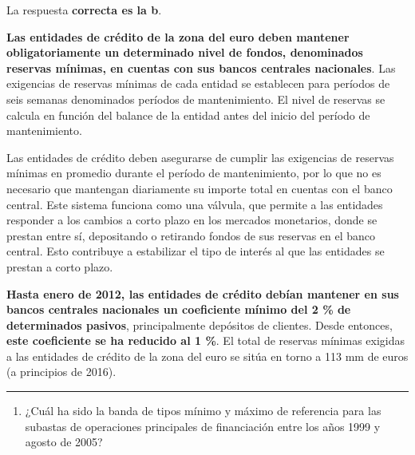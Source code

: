 \documentclass[
  letterpaper,
  DIV=11,
  numbers=noendperiod]{scrreprt}
\providecommand{\tightlist}{%
  \setlength{\itemsep}{0pt}\setlength{\parskip}{0pt}}\usepackage{longtable,booktabs,array}
\begin{document}
\begin{tcolorbox}[enhanced jigsaw, left=2mm, opacityback=0, colback=white, breakable, arc=.35mm, bottomrule=.15mm, rightrule=.15mm, toprule=.15mm, leftrule=.75mm, colframe=quarto-callout-tip-color-frame]
\begin{minipage}[t]{5.5mm}
\textcolor{quarto-callout-tip-color}{\faLightbulb}
\end{minipage}%
\begin{minipage}[t]{\textwidth - 5.5mm}

La respuesta \textbf{correcta es la b}.

\textbf{Las entidades de crédito de la zona del euro deben mantener
obligatoriamente un determinado nivel de fondos, denominados reservas
mínimas, en cuentas con sus bancos centrales nacionales}. Las exigencias
de reservas mínimas de cada entidad se establecen para períodos de seis
semanas denominados períodos de mantenimiento. El nivel de reservas se
calcula en función del balance de la entidad antes del inicio del
período de mantenimiento.

Las entidades de crédito deben asegurarse de cumplir las exigencias de
reservas mínimas en promedio durante el período de mantenimiento, por lo
que no es necesario que mantengan diariamente su importe total en
cuentas con el banco central. Este sistema funciona como una válvula,
que permite a las entidades responder a los cambios a corto plazo en los
mercados monetarios, donde se prestan entre sí, depositando o retirando
fondos de sus reservas en el banco central. Esto contribuye a
estabilizar el tipo de interés al que las entidades se prestan a corto
plazo.

\textbf{Hasta enero de 2012, las entidades de crédito debían mantener en
sus bancos centrales nacionales un coeficiente mínimo del 2 \% de
determinados pasivos}, principalmente depósitos de clientes. Desde
entonces, \textbf{este coeficiente se ha reducido al 1 \%}. El total de
reservas mínimas exigidas a las entidades de crédito de la zona del euro
se sitúa en torno a 113 mm de euros (a principios de 2016).

\end{minipage}%
\end{tcolorbox}

\begin{center}\rule{0.5\linewidth}{0.5pt}\end{center}

\begin{enumerate}
\def\labelenumi{\arabic{enumi}.}
\setcounter{enumi}{34}
\tightlist
\item
  ¿Cuál ha sido la banda de tipos mínimo y máximo de referencia para las
  subastas de operaciones principales de financiación entre los años
  1999 y agosto de 2005?
\end{enumerate}
\end{document}
